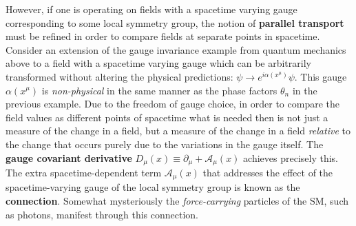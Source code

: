 \newcommand{\conn}{ \ensuremath{ \boldsymbol{\mathcal{A}} } }
However, if one is operating on fields with a spacetime varying gauge corresponding to some local symmetry group, the notion of \textbf{parallel transport} must be refined in order to compare fields at separate points in spacetime.
Consider an extension of the gauge invariance example from quantum mechanics above to a field with a spacetime varying gauge which can be arbitrarily transformed without altering the physical predictions: $\psi \rightarrow e^{i\alpha(x^\mu)} \psi$.
This gauge $\alpha(x^\mu)$ is \textit{non-physical} in the same manner as the phase factors $\theta_n$ in the previous example.
Due to the freedom of gauge choice, in order to compare the field values as different points of spacetime what is needed then is not just a measure of the change in a field, but a measure of the change in a field \textit{relative} to the change that occurs purely due to the variations in the gauge itself.
The \textbf{gauge covariant derivative} $D_\mu(x) \equiv \partial_\mu + \conn_\mu(x)$ achieves precisely this.
The extra spacetime-dependent term $\conn_\mu(x)$ that addresses the effect of the spacetime-varying gauge of the local symmetry group is known as the \textbf{connection}.
Somewhat mysteriously the \textit{force-carrying} particles of the SM, such as photons, manifest through this connection.

